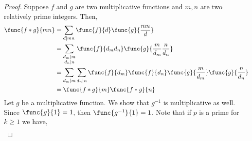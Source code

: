 \begin{proof}
    Suppose \(f\) and \(g\) are two multiplicative functions and \(m,n\) are two relatively prime integers. Then, 
    \begin{align*}
        \func{f \ast g}{m n} &= \sum_{d \mid mn} \func{f}{d} \func{g}{\frac{mn}{d}}\\
        &= \sum_{\substack{d_m \mid m \\ d_n \mid n}} \func{f}{d_m d_n} \func{g}{\frac{m}{d_m} \frac{n}{d_n}}\\
        &= \sum_{d_m \mid m} \sum_{d_n \mid n} \func{f}{d_m} \func{f}{d_n} \func{g}{\frac{m}{d_m}} \func{g}{\frac{n}{d_n}}\\
        &= \func{f \ast g}{m} \func{f \ast g}{n}
    \end{align*} 
    Let \(g\) be a multiplicative function. We show that \(g^{-1}\) is multiplicative as well. Since \(\func{g}{1} = 1\), then \(\func{g^{-1}}{1} = 1\). 
    Note that if \(p\) is a prime for \(k \geq 1\) we have, 
    \begin{align*}

\end{align*}
\end{proof}
